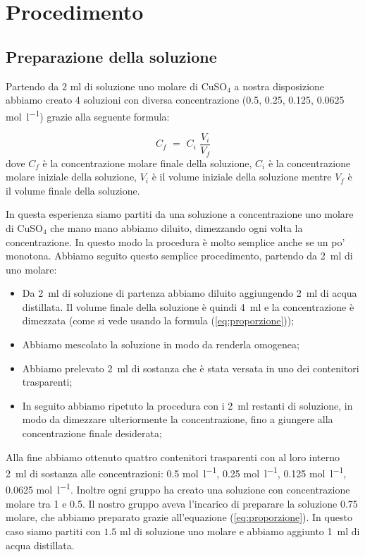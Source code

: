 
\section{Procedimento}

\subsection{Preparazione della soluzione}

Partendo da $2\,\,\si{\milli\litre}$ di soluzione uno molare di CuSO$_4$ a nostra disposizione abbiamo creato 4 soluzioni con diversa concentrazione (0.5, 0.25, 0.125, 0.0625 \si{\mol\per\litre}) grazie alla seguente formula:

\begin{equation}
	C_f \,\, = \,\, C_i \,\, \frac{V_i}{V_f}
	\label{eq:proporzione}
\end{equation}
%
dove $C_f$ è la concentrazione molare finale della soluzione, $C_i$ è la concentrazione molare iniziale della soluzione, $V_i$ è il volume iniziale della soluzione mentre $V_f$ è il volume finale della soluzione.

In questa esperienza siamo partiti da una soluzione a concentrazione uno molare di CuSO$_4$ che mano mano abbiamo diluito,
dimezzando ogni volta la concentrazione. In questo modo la procedura è molto semplice anche se un po' monotona.
Abbiamo seguito questo semplice procedimento, partendo da \SI{2}{\milli\litre} di uno molare:

\begin{itemize}
	\item{Da \SI{2}{\milli\litre} di soluzione di partenza abbiamo diluito aggiungendo \SI{2}{\milli\litre} di acqua distillata.
	    Il volume finale della soluzione è quindi \SI{4}{\milli\litre} e la concentrazione è dimezzata (come si vede usando la formula
	    (\ref{eq:proporzione}));}
	\item{Abbiamo mescolato la soluzione in modo da renderla omogenea;}
	\item{Abbiamo prelevato \SI{2}{\milli\litre} di sostanza che è stata versata in uno dei contenitori trasparenti;}
	\item{In seguito abbiamo ripetuto la procedura con i \SI{2}{\milli\litre} restanti di soluzione, in modo da dimezzare ulteriormente la concentrazione, fino a giungere alla concentrazione finale desiderata;}
\end{itemize}

Alla fine abbiamo ottenuto quattro contenitori trasparenti con al loro interno \SI{2}{\milli\litre} di sostanza alle concentrazioni:
0.5 \si{\mol\per\litre}, 0.25 \si{\mol\per\litre}, 0.125 \si{\mol\per\litre}, 0.0625 \si{\mol\per\litre}.
Inoltre ogni gruppo ha creato una soluzione con concentrazione molare tra 1 e 0.5.
Il nostro gruppo aveva l'incarico di preparare la soluzione 0.75 molare, che abbiamo preparato
grazie all'equazione (\ref{eq:proporzione}). In questo caso siamo partiti con
$1.5\,\,\si{\milli\litre}$ di soluzione uno molare e abbiamo aggiunto \SI{1}{\milli\litre} di acqua distillata. 

